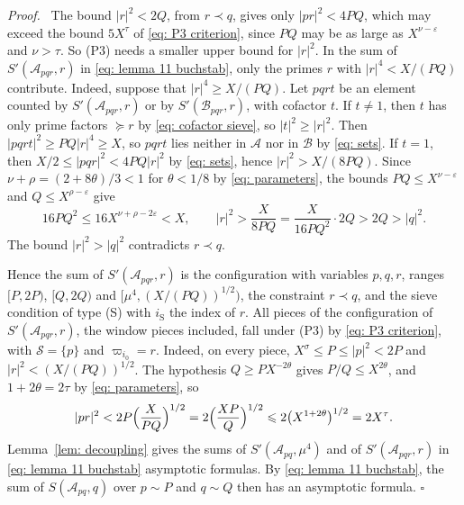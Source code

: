 \documentclass{article}
\numberwithin{equation}{section}
\newenvironment{proof}[1][Proof]{\par\medskip\noindent\textit{#1.}\ }{\hfill$\square$\par\medskip}
\newcommand{\Le}{\leqslant}
\newcommand{\Ge}{\geqslant}
\begin{document}
\begin{proof}
The bound $|r|^2 < 2Q$, from $r \prec q$, gives only $|pr|^2 < 4PQ$, which may exceed the bound $5X^{\tau}$ of \eqref{eq: P3 criterion}, since $PQ$ may be as large as $X^{\nu - \varepsilon}$ and $\nu > \tau$. So (P3) needs a smaller upper bound for $|r|^2$. In the sum of $S'(\mathcal{A}_{pqr}, r)$ in \eqref{eq: lemma 11 buchstab}, only the primes $r$ with $|r|^4 < X/(PQ)$ contribute. Indeed, suppose that $|r|^4 \Ge X/(PQ)$. Let $pqrt$ be an element counted by $S'(\mathcal{A}_{pqr}, r)$ or by $S'(\mathcal{B}_{pqr}, r)$, with cofactor $t$. If $t \neq 1$, then $t$ has only prime factors $\succcurlyeq r$ by \eqref{eq: cofactor sieve}, so $|t|^2 \Ge |r|^2$. Then $|pqrt|^2 \Ge PQ |r|^4 \Ge X$, so $pqrt$ lies neither in $\mathcal{A}$ nor in $\mathcal{B}$ by \eqref{eq: sets}. If $t = 1$, then $X/2 \Le |pqr|^2 < 4PQ|r|^2$ by \eqref{eq: sets}, hence $|r|^2 > X/(8PQ)$. Since $\nu + \rho = (2 + 8\theta)/3 < 1$ for $\theta < 1/8$ by \eqref{eq: parameters}, the bounds $PQ \Le X^{\nu - \varepsilon}$ and $Q \Le X^{\rho - \varepsilon}$ give
\begin{equation*}
16PQ^2 \Le 16X^{\nu + \rho - 2\varepsilon} < X, \qquad |r|^2 > \frac{X}{8PQ} = \frac{X}{16PQ^2} \cdot 2Q > 2Q > |q|^2.
\end{equation*}
The bound $|r|^2 > |q|^2$ contradicts $r \prec q$.

Hence the sum of $S'(\mathcal{A}_{pqr}, r)$ is the configuration with variables $p, q, r$, ranges $[P, 2P)$, $[Q, 2Q)$ and $[\mu^4, (X/(PQ))^{1/2})$, the constraint $r \prec q$, and the sieve condition of type (S) with $i_{\mathrm{S}}$ the index of $r$. All pieces of the configuration of $S'(\mathcal{A}_{pqr}, r)$, the window pieces included, fall under (P3) by \eqref{eq: P3 criterion}, with $\mathcal{S} = \{p\}$ and $\varpi_{i_0} = r$. Indeed, on every piece, $X^{\sigma} \Le P \Le |p|^2 < 2P$ and $|r|^2 < (X/(PQ))^{1/2}$. The hypothesis $Q \Ge P X^{-2\theta}$ gives $P/Q \Le X^{2\theta}$, and $1 + 2\theta = 2\tau$ by \eqref{eq: parameters}, so
\begin{equation*}
|pr|^2 < 2P \Bigl( \frac{X}{PQ} \Bigr)^{1/2} = 2 \Bigl( \frac{XP}{Q} \Bigr)^{1/2} \Le 2 \bigl( X^{1 + 2\theta} \bigr)^{1/2} = 2X^{\tau}.
\end{equation*}
Lemma~\ref{lem: decoupling} gives the sums of $S'(\mathcal{A}_{pq}, \mu^4)$ and of $S'(\mathcal{A}_{pqr}, r)$ in \eqref{eq: lemma 11 buchstab} asymptotic formulas. By \eqref{eq: lemma 11 buchstab}, the sum of $S(\mathcal{A}_{pq}, q)$ over $p \sim P$ and $q \sim Q$ then has an asymptotic formula.
\end{proof}
\end{document}
